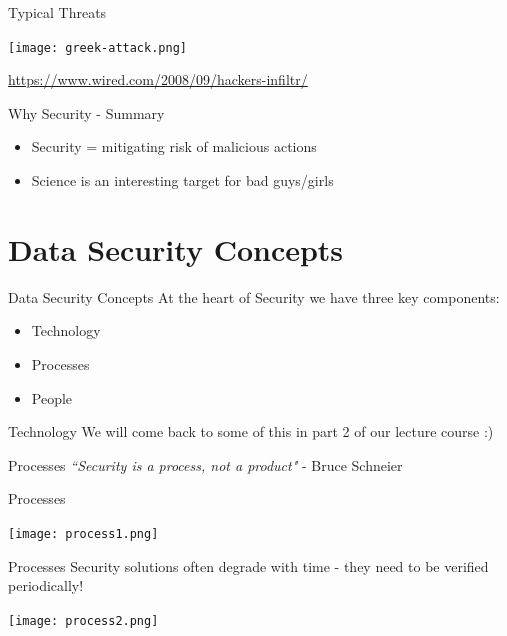 \documentclass[aspectratio=169]{beamer}
\begin{document}
\begin{frame}{Typical Threats}
  \begin{center}
      \texttt{[image: greek-attack.png]}  \newline
  	 {\small \url{https://www.wired.com/2008/09/hackers-infiltr/} \par}
  \end{center}
\end{frame}


\begin{frame}{Why Security - Summary}
\begin{itemize}
\item Security = mitigating risk of malicious actions
\item Science is an interesting target for bad guys/girls
\end{itemize}
\end{frame}

\section{Data Security Concepts}
\frame{\sectionpage}

\begin{frame}{Data Security Concepts}
At the heart of Security we have three key components:
	\begin{itemize}
		\item Technology
		\item Processes
        \item People
	\end{itemize}
\end{frame}

\begin{frame}{Technology}
We will come back to some of this in part 2 of our lecture course :) 
\end{frame}

\begin{frame}{Processes}
\textit{``Security is a process, not a product"} - Bruce Schneier
\end{frame}

\begin{frame}{Processes}
\begin{center}
\texttt{[image: process1.png]} 
\end{center}
\end{frame}

\begin{frame}{Processes}
Security solutions often degrade with time - they need to be verified periodically!
\begin{center}
\texttt{[image: process2.png]} 
\end{center}
\end{frame}
\end{document}
